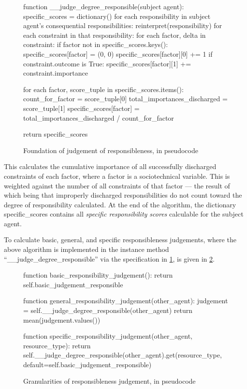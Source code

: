 \begin{figure}[h]
    \centering
    \begin{pseudocodelisting}
    function __judge_degree_responsible(subject agent):
        specific_scores = dictionary()
        for each responsibility in subject agent's consequential responsibilities:
            reinterpret(responsibility)
            for each constraint in that responsibility:
                for each factor, delta in constraint:
                    if factor not in specific_scores.keys():
                        specific_scores[factor] = (0, 0)
                    specific_scores[factor][0] += 1
                    if constraint.outcome is True:
                        specific_scores[factor][1] += constraint.importance
                        
        for each factor, score_tuple in specific_scores.items():
            count_for_factor = score_tuple[0]
            total_importances_discharged = score_tuple[1]
            specific_scores[factor] = total_importances_discharged / count_for_factor
            
        return specific_scores
    \end{pseudocodelisting} 
    \caption{Foundation of judgement of responsibleness, in pseudocode}
    \label{code:judge_degree_responsible}
\end{figure}

This calculates the cumulative importance of all successfully discharged constraints of each factor, where a factor is a sociotechnical variable. This is weighted against the number of all constraints of that factor --- the result of which being that improperly discharged responsibilities do not count toward the degree of responsibility calculated. At the end of the algorithm, the dictionary specific\_scores contains all \emph{specific responsibility scores} calculable for the subject agent.\par

To calculate basic, general, and specific responsibleness judgements, where the above algorithm is implemented in the instance method ``\_\_judge\_degree\_responsible'' via the specification in \cref{code:judge_degree_responsible}, is given in \cref{code:judgement_granularities}.

\begin{figure}[h]
    \centering
    \begin{pseudocodelisting}
    function basic_responsibility_judgement():
        return self.basic_judgement_responsible

    function general_responsibility_judgement(other_agent):
        judgement = self.__judge_degree_responsible(other_agent)
        return mean(judgement.values())

    function specific_responsibility_judgement(other_agent, resource_type):
        return self.__judge_degree_responsible(other_agent).get(resource_type, default=self.basic_judgement_responsible)
    \end{pseudocodelisting}
    \caption{Granularities of responsibleness judgement, in pseudocode}
    \label{code:judgement_granularities}
\end{figure}

